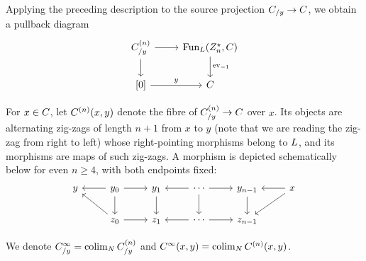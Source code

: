 \documentclass[a4paper,reqno,twoside]{amsart}
\begin{document}
Applying the preceding description to the source projection $\relax{C}_{/y}\to\relax{C}$, we obtain a pullback diagram
 \[
	\begin{tikzcd}
		{\cC_{/y}^{(n)}} \arrow[r] \arrow[d] & \Fun_{\cL}(Z_n^{\star},\cC) \arrow[d,"\ev_{-1}"] \\
		{[0]} \arrow[r,"y"] & \cC
	\end{tikzcd}
 \]
 \begin{definition}
	For $x\in\relax{C}$, let $\relax{C}^{(n)}(x,y)$ denote the fibre of $\relax{C}_{/y}^{(n)}\to\relax{C}$ over $x$. Its objects are alternating zig-zags of length $n+1$ from $x$ to $y$ (note that we are reading the zig-zag from right to left) whose right-pointing morphisms belong to $\relax{L}$, and its morphisms are maps of such zig-zags. A morphism is depicted schematically below for even $n\geq4$, with both endpoints fixed:
 \[\begin{tikzcd}
	{y} & {y_0} & {y_1} & \cdots & {y_{n-1}} & {x} \\
	& {z_0} & {z_1} & \cdots & {z_{n-1}}
	\arrow[from=1-2, to=1-1]
	\arrow[from=1-2, to=1-3]
	\arrow[from=1-2, to=2-2]
	\arrow[from=1-3, to=2-3]
	\arrow[from=1-4, to=1-3]
	\arrow[from=1-4, to=2-4]
	\arrow[from=1-4, to=1-5]
	\arrow[from=1-6, to=1-5]
	\arrow[from=1-5, to=2-5]
	\arrow[from=2-2, to=1-1]
	\arrow[from=2-2, to=2-3]
	\arrow[from=2-4, to=2-3]
	\arrow[from=2-4, to=2-5]
	\arrow[from=1-6, to=2-5]
\end{tikzcd}\]
 \end{definition}

 \begin{notation}\label{not:cinfty}
	We denote $\relax{C}^{\infty}_{/y}= \operatorname*{colim}_{\relax{N}}\relax{C}^{(n)}_{/y}$ and  $\relax{C}^{\infty}(x,y)= \operatorname*{colim}_{\relax{N}}\relax{C}^{(n)}(x,y)$.
 \end{notation}
\end{document}
